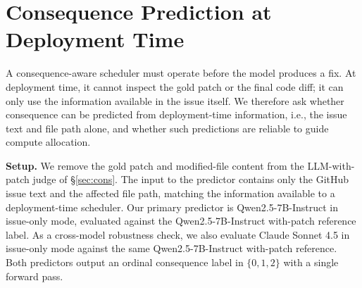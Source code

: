 \documentclass{article}
\begin{document}
\begin{table}[h]
\centering
{}
\caption{\textbf{Model audit on SWE-bench Lite.} We report sample size $n$,
configured token budget $\mathrm{max\_new}$, Spearman rank correlation
between thinking length and consequence, $p$-value, average difference
in thinking length between high- and low-consequence tasks, and the
observed failure mode relative to the cost-weighted allocation objective.}
\label{tab:audit}
\end{table}

\section{Consequence Prediction at Deployment Time}
\label{sec:pred}

A consequence-aware scheduler must operate before the model produces a
fix. At deployment time, it cannot inspect the gold patch or the final
code diff; it can only use the information available in the issue
itself. We therefore ask whether consequence can be predicted from deployment-time
information, i.e., the
issue text and file path alone, and whether such predictions are reliable to guide compute allocation.

\textbf{Setup.} We remove the gold patch and modified-file content from the LLM-with-patch judge of \S\ref{sec:cons}. The input to the predictor contains only the GitHub issue text and the affected file path, matching the information available to a deployment-time scheduler. Our primary predictor is Qwen2.5-7B-Instruct in issue-only mode, evaluated against the Qwen2.5-7B-Instruct with-patch reference label. As a cross-model robustness check, we also evaluate Claude Sonnet 4.5 in
issue-only mode against the same Qwen2.5-7B-Instruct with-patch reference. Both predictors output an ordinal consequence label in $\{0,1,2\}$ with a single forward pass.
\end{document}
